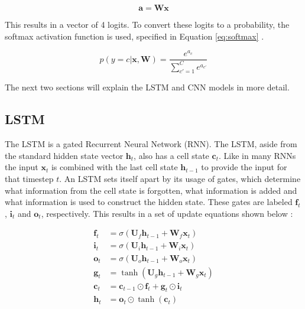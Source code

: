 \documentclass[12pt,a4paper,english]{article}
\begin{document}
\begin{equation}
    \boldsymbol{a} = \boldsymbol{W}\boldsymbol{x}
    \label{eq:linmodel}
\end{equation}

This results in a vector of 4 logits. To convert these logits to a probability, the softmax activation function is used, specified in Equation \eqref{eq:softmax} \cite{pml1Book}.

\begin{equation}
    p(y=c|\boldsymbol{x}, \boldsymbol{W}) = \frac{e^{a_c}}{\sum_{c'=1}^C e^{a_{c'}} }
    \label{eq:softmax}
\end{equation}

The next two sections will explain the LSTM and CNN models in more detail.

\subsection{LSTM}
The LSTM is a gated Recurrent Neural Network (RNN). The LSTM, aside from the standard hidden state vector $\boldsymbol{h}_t$, also has a cell state $\boldsymbol{c}_t$. Like in many RNNs the input $\boldsymbol{x}_t$ is combined with the last cell state $\boldsymbol{h}_{t-1}$ to provide the input for that timestep $t$. An LSTM sets itself apart by its usage of gates, which determine what information from the cell state is forgotten, what information is added and what information is used to construct the hidden state. These gates are labeled $\boldsymbol{f}_t$, $\boldsymbol{i}_t$ and $\boldsymbol{o}_t$, respectively. This results in a set of update equations shown below \cite{jm3}:

\begin{align}
    \boldsymbol{f}_t &= \sigma(\boldsymbol{U}_f\boldsymbol{h}_{t-1} + \boldsymbol{W}_f\boldsymbol{x}_t) \\
    \boldsymbol{i}_t &= \sigma(\boldsymbol{U}_i\boldsymbol{h}_{t-1} + \boldsymbol{W}_i\boldsymbol{x}_t) \\
    \boldsymbol{o}_t &= \sigma(\boldsymbol{U}_o\boldsymbol{h}_{t-1} + \boldsymbol{W}_o\boldsymbol{x}_t) \\
    \boldsymbol{g}_t &= \tanh(\boldsymbol{U}_g\boldsymbol{h}_{t-1} + \boldsymbol{W}_g\boldsymbol{x}_t) \\
    \boldsymbol{c}_t &= \boldsymbol{c}_{t-1} \odot \boldsymbol{f}_t + \boldsymbol{g}_t\odot \boldsymbol{i}_t \\
    \boldsymbol{h}_t &= \boldsymbol{o}_t \odot \tanh(\boldsymbol{c}_t)
\end{align}
\end{document}
